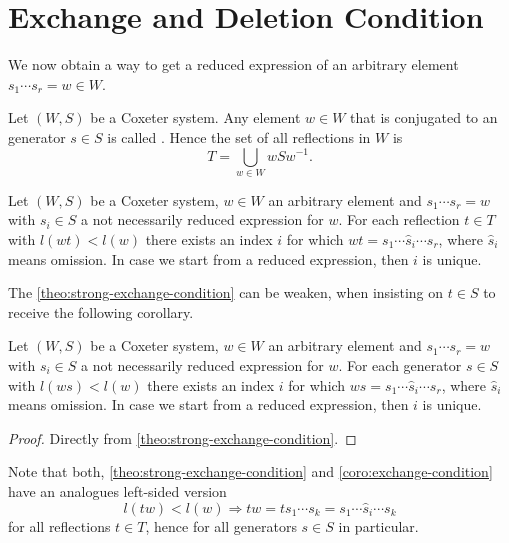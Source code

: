 \section{Exchange and Deletion Condition}
\label{sec:coxeter-groups-exchange-deletion-condition}

We now obtain a way to get a reduced expression of an arbitrary element $s_1 \cdots s_r = w \in W$.

\begin{defi}
	Let $(W,S)$ be a Coxeter system. Any element $w \in W$ that is conjugated to an generator $s \in S$ is called . Hence the set of all reflections in $W$ is
	$$ T = \bigcup_{w \in W} wSw^{-1}. $$
\end{defi}

\begin{theo}
	Let $(W,S)$ be a Coxeter system, $w \in W$ an arbitrary element and ${s_1 \cdots s_r = w}$ with $s_i \in S$ a not necessarily reduced expression for $w$. For each reflection $t \in T$ with $l(wt) < l(w)$ there exists an index $i$ for which $wt = s_1 \cdots \hat s_i \cdots s_r$, where $\hat s_i$ means omission. In case we start from a reduced expression, then $i$ is unique.
\end{theo}

The \ref{theo:strong-exchange-condition} can be weaken, when insisting on $t \in S$ to receive the following corollary.

\begin{coro}
	Let $(W,S)$ be a Coxeter system, $w \in W$ an arbitrary element and ${s_1 \cdots s_r = w}$ with $s_i \in S$ a not necessarily reduced expression for $w$. For each generator $s \in S$ with $l(ws) < l(w)$ there exists an index $i$ for which $ws = s_1 \cdots \hat s_i \cdots s_r$, where $\hat s_i$ means omission. In case we start from a reduced expression, then $i$ is unique.

	\begin{proof}
		Directly from \ref{theo:strong-exchange-condition}.
	\end{proof}
\end{coro}

\begin{rema}
	Note that both, \ref{theo:strong-exchange-condition} and \ref{coro:exchange-condition} have an analogues left-sided version
	$$ l(tw) < l(w) \Rightarrow tw = t s_1 \cdots s_k = s_1 \cdots \hat s_i \cdots s_k $$
	for all reflections $t \in T$, hence for all generators $s \in S$ in particular.
\end{rema}

